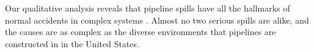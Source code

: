 \documentclass[12pt, man, natbib]{apa6}
\begin{document}
	Our qualitative analysis reveals that pipeline spills have all the hallmarks of normal accidents in complex systems \citep{Perrow1984}. Almost no two serious spills are alike, and the causes are as complex as the diverse environments that pipelines are constructed in in the United States. 
	
	
	
	
		
	




	
	
	
\end{document}
